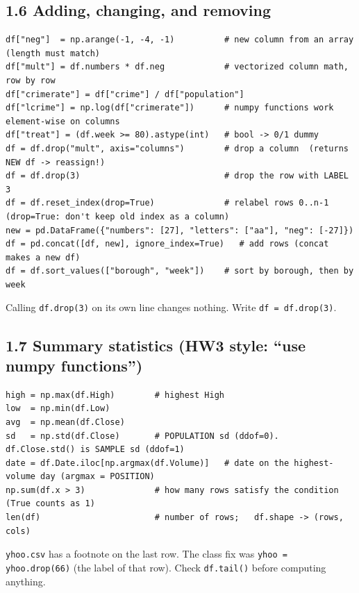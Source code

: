 \documentclass[10pt]{article}
\newcommand{\code}[1]{\lstinline[basicstyle=\ttfamily\small]{#1}}
\begin{document}
\subsection*{1.6 Adding, changing, and removing}
\begin{lstlisting}
df["neg"]  = np.arange(-1, -4, -1)          # new column from an array (length must match)
df["mult"] = df.numbers * df.neg            # vectorized column math, row by row
df["crimerate"] = df["crime"] / df["population"]
df["lcrime"] = np.log(df["crimerate"])      # numpy functions work element-wise on columns
df["treat"] = (df.week >= 80).astype(int)   # bool -> 0/1 dummy
df = df.drop("mult", axis="columns")        # drop a column  (returns NEW df -> reassign!)
df = df.drop(3)                             # drop the row with LABEL 3
df = df.reset_index(drop=True)              # relabel rows 0..n-1 (drop=True: don't keep old index as a column)
new = pd.DataFrame({"numbers": [27], "letters": ["aa"], "neg": [-27]})
df = pd.concat([df, new], ignore_index=True)   # add rows (concat makes a new df)
df = df.sort_values(["borough", "week"])    # sort by borough, then by week
\end{lstlisting}
\begin{trap}
Calling \code{df.drop(3)} on its own line changes nothing. Write \code{df = df.drop(3)}.
\end{trap}

\subsection*{1.7 Summary statistics (HW3 style: ``use numpy functions'')}
\begin{lstlisting}
high = np.max(df.High)        # highest High
low  = np.min(df.Low)
avg  = np.mean(df.Close)
sd   = np.std(df.Close)       # POPULATION sd (ddof=0).  df.Close.std() is SAMPLE sd (ddof=1)
date = df.Date.iloc[np.argmax(df.Volume)]   # date on the highest-volume day (argmax = POSITION)
np.sum(df.x > 3)              # how many rows satisfy the condition (True counts as 1)
len(df)                       # number of rows;   df.shape -> (rows, cols)
\end{lstlisting}
\begin{trap}
\code{yhoo.csv} has a footnote on the last row. The class fix was \code{yhoo = yhoo.drop(66)} (the label of that row). Check \code{df.tail()} before computing anything.
\end{trap}
\end{document}
